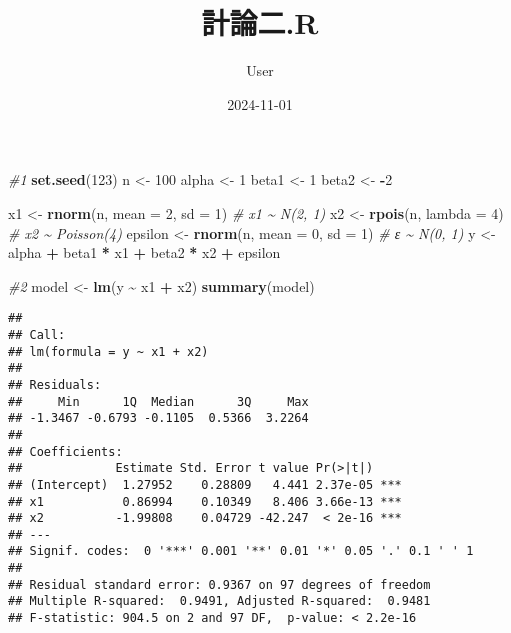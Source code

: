 \documentclass[
]{article}
\title{計論二.R}
\author{User}
\date{2024-11-01}
\newenvironment{Shaded}{\begin{snugshade}}{\end{snugshade}}
\newcommand{\AttributeTok}[1]{\textcolor[rgb]{0.13,0.29,0.53}{#1}}
\newcommand{\CommentTok}[1]{\textcolor[rgb]{0.56,0.35,0.01}{\textit{#1}}}
\newcommand{\DecValTok}[1]{\textcolor[rgb]{0.00,0.00,0.81}{#1}}
\newcommand{\FunctionTok}[1]{\textcolor[rgb]{0.13,0.29,0.53}{\textbf{#1}}}
\newcommand{\NormalTok}[1]{#1}
\newcommand{\OtherTok}[1]{\textcolor[rgb]{0.56,0.35,0.01}{#1}}
\newcommand{\SpecialCharTok}[1]{\textcolor[rgb]{0.81,0.36,0.00}{\textbf{#1}}}
\begin{document}
\maketitle

\begin{Shaded}
\begin{Highlighting}[]
\CommentTok{\#1}
\FunctionTok{set.seed}\NormalTok{(}\DecValTok{123}\NormalTok{)  }
\NormalTok{n }\OtherTok{\textless{}{-}} \DecValTok{100} 
\NormalTok{alpha }\OtherTok{\textless{}{-}} \DecValTok{1}
\NormalTok{beta1 }\OtherTok{\textless{}{-}} \DecValTok{1}
\NormalTok{beta2 }\OtherTok{\textless{}{-}} \SpecialCharTok{{-}}\DecValTok{2}

\NormalTok{x1 }\OtherTok{\textless{}{-}} \FunctionTok{rnorm}\NormalTok{(n, }\AttributeTok{mean =} \DecValTok{2}\NormalTok{, }\AttributeTok{sd =} \DecValTok{1}\NormalTok{)            }\CommentTok{\# x1 \textasciitilde{} N(2, 1)}
\NormalTok{x2 }\OtherTok{\textless{}{-}} \FunctionTok{rpois}\NormalTok{(n, }\AttributeTok{lambda =} \DecValTok{4}\NormalTok{)                  }\CommentTok{\# x2 \textasciitilde{} Poisson(4)}
\NormalTok{epsilon }\OtherTok{\textless{}{-}} \FunctionTok{rnorm}\NormalTok{(n, }\AttributeTok{mean =} \DecValTok{0}\NormalTok{, }\AttributeTok{sd =} \DecValTok{1}\NormalTok{)       }\CommentTok{\# ε \textasciitilde{} N(0, 1)}
\NormalTok{y }\OtherTok{\textless{}{-}}\NormalTok{ alpha }\SpecialCharTok{+}\NormalTok{ beta1 }\SpecialCharTok{*}\NormalTok{ x1 }\SpecialCharTok{+}\NormalTok{ beta2 }\SpecialCharTok{*}\NormalTok{ x2 }\SpecialCharTok{+}\NormalTok{ epsilon}

\CommentTok{\#2}
\NormalTok{model }\OtherTok{\textless{}{-}} \FunctionTok{lm}\NormalTok{(y }\SpecialCharTok{\textasciitilde{}}\NormalTok{ x1 }\SpecialCharTok{+}\NormalTok{ x2)}
\FunctionTok{summary}\NormalTok{(model)}
\end{Highlighting}
\end{Shaded}

\begin{verbatim}
## 
## Call:
## lm(formula = y ~ x1 + x2)
## 
## Residuals:
##     Min      1Q  Median      3Q     Max 
## -1.3467 -0.6793 -0.1105  0.5366  3.2264 
## 
## Coefficients:
##             Estimate Std. Error t value Pr(>|t|)    
## (Intercept)  1.27952    0.28809   4.441 2.37e-05 ***
## x1           0.86994    0.10349   8.406 3.66e-13 ***
## x2          -1.99808    0.04729 -42.247  < 2e-16 ***
## ---
## Signif. codes:  0 '***' 0.001 '**' 0.01 '*' 0.05 '.' 0.1 ' ' 1
## 
## Residual standard error: 0.9367 on 97 degrees of freedom
## Multiple R-squared:  0.9491, Adjusted R-squared:  0.9481 
## F-statistic: 904.5 on 2 and 97 DF,  p-value: < 2.2e-16
\end{verbatim}
\end{document}
